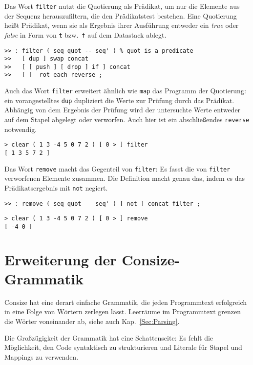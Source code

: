 Das Wort \verb|filter| nutzt die Quotierung als Prädikat, um nur die Elemente aus der Sequenz herauszufiltern, die den Prädikatstest bestehen. Eine Quotierung heißt Prädikat, wenn sie als Ergebnis ihrer Ausführung entweder ein \emph{true} oder \emph{false} in Form von \verb|t| bzw.\ \verb|f| auf dem Datastack ablegt.

\begin{verbatim}
>> : filter ( seq quot -- seq' ) % quot is a predicate
>>   [ dup ] swap concat
>>   [ [ push ] [ drop ] if ] concat
>>   [ ] -rot each reverse ;
\end{verbatim}

Auch das Wort \verb|filter| erweitert ähnlich wie \verb|map| das Programm der Quotierung: ein vorangestelltes \verb|dup| dupliziert die Werte zur Prüfung durch das Prädikat. Abhängig von dem Ergebnis der Prüfung wird der untersuchte Werte entweder auf dem Stapel abgelegt oder verworfen. Auch hier ist ein abschließendes \verb|reverse| notwendig.

\begin{verbatim}
> clear ( 1 3 -4 5 0 7 2 ) [ 0 > ] filter
[ 1 3 5 7 2 ]
\end{verbatim}

Das Wort \verb|remove| macht das Gegenteil von \verb|filter|: Es fasst die von \verb|filter| verworfenen Elemente zusammen. Die Definition macht genau das, indem es das Prädikatsergebnis mit \verb|not| negiert.

\begin{verbatim}
>> : remove ( seq quot -- seq' ) [ not ] concat filter ;
\end{verbatim}

\begin{verbatim}
> clear ( 1 3 -4 5 0 7 2 ) [ 0 > ] remove
[ -4 0 ]
\end{verbatim}

\section{Erweiterung der Consize-Grammatik}
\label{Sec:Grammatik+}

Consize hat eine derart einfache Grammatik, die jeden Programmtext erfolgreich in eine Folge von Wörtern zerlegen lässt. Leerräume im Programmtext grenzen die Wörter voneinander ab, siehe auch Kap.~\ref{Sec:Parsing}.

Die Großzügigkeit der Grammatik hat eine Schattenseite: Es fehlt die Möglichkeit, den Code syntaktisch zu strukturieren und Literale für Stapel und Mappings zu verwenden.

